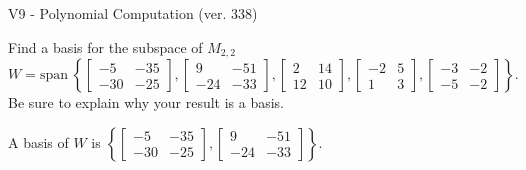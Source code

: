 \begin{exercise}
  \begin{exerciseTitle}V9 - Polynomial Computation (ver. 338)\end{exerciseTitle}
  \begin{exerciseStatement}
    Find a basis for the subspace of \(M_{2,2}\) 
\[W=\mathrm{span}\ \left\{\left[\begin{array}{cc}
-5 & -35 \\
-30 & -25
\end{array}\right] , \left[\begin{array}{cc}
9 & -51 \\
-24 & -33
\end{array}\right] , \left[\begin{array}{cc}
2 & 14 \\
12 & 10
\end{array}\right] , \left[\begin{array}{cc}
-2 & 5 \\
1 & 3
\end{array}\right] , \left[\begin{array}{cc}
-3 & -2 \\
-5 & -2
\end{array}\right]\right\}.\]
 Be sure to explain why your result is a basis.


  \end{exerciseStatement}
  \begin{exerciseAnswer}
   A basis of \(W\) is  \(\left\{\left[\begin{array}{cc}
-5 & -35 \\
-30 & -25
\end{array}\right] , \left[\begin{array}{cc}
9 & -51 \\
-24 & -33
\end{array}\right]\right\}\).
  


  \end{exerciseAnswer}
\end{exercise}